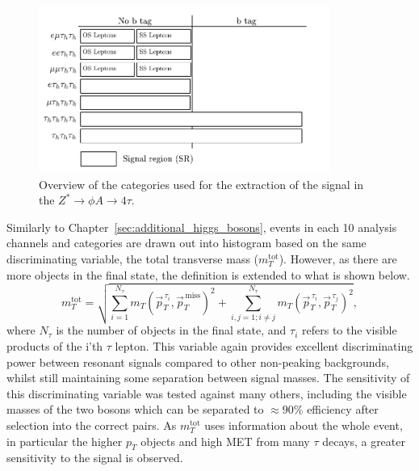 \begin{figure}[!hbtp]
\centering
    \includegraphics[width=0.85\textwidth]{Figures/event-categories_4tau.pdf}
\caption{Overview of the categories used for the extraction of the signal in the $Z^{*}\rightarrow \phi A \rightarrow 4\tau$.}
\label{fig:4tau_categories}
\end{figure}

Similarly to Chapter~\ref{sec:additional_higgs_bosons}, events in each 10 analysis channels and categories are drawn out into histogram based on the same discriminating variable, the total transverse mass ($m_{T}^{\text{tot
}}$).
However, as there are more objects in the final state, the definition is extended to what is shown below.
\begin{equation}
m_{T}^{\text{tot}} = \sqrt{ \sum_{i=1}^{N_\tau} m_{T}(\vec{p}_{T}^{\hspace{2pt}\tau_i},\vec{p}_{T}^{\hspace{2pt}\text{miss}})^2 + \sum_{i,j=1; i \neq j}^{N_\tau} m_{T}(\vec{p}_{T}^{\hspace{2pt}\tau_i},\vec{p}_{T}^{\hspace{2pt}\tau_j})^2 },  
\end{equation}
where $N_\tau$ is the number of objects in the final state, and $\tau_i$ refers to the visible products of the i'th $\tau$ lepton.
This variable again provides excellent discriminating power between resonant signals compared to other non-peaking backgrounds, whilst still maintaining some separation between signal masses.
The sensitivity of this discriminating variable was tested against many others, including the visible masses of the two bosons which can be separated to $\approx 90\%$ efficiency after selection into the correct pairs. 
As $m_{T}^{\text{tot}}$ uses information about the whole event, in particular the higher $p_{T}$ objects and high \ac{MET} from many $\tau$ decays, a greater sensitivity to the signal is observed. \\

